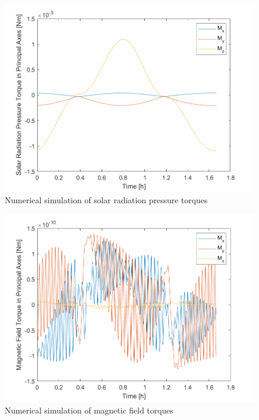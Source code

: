 \begin{figure}[H]
\centering
\includegraphics[scale=0.6]{Images/ps5_problem3_srp.png}
\caption{Numerical simulation of solar radiation pressure torques}
\label{fig:ps5_problem3_srp}
\end{figure}

\begin{figure}[H]
\centering
\includegraphics[scale=0.6]{Images/ps5_problem3_mag.png}
\caption{Numerical simulation of magnetic field torques}
\label{fig:ps5_problem3_mag}
\end{figure}